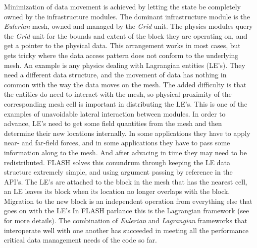 Minimization of data movement is achieved by letting the state be
completely owned by the infrastructure modules. The dominant
infrastructure module is the {\em Eulerian} mesh, owned and managed by
the {\em Grid} unit. The physics modules query the {\em Grid} unit
for the bounds and extent of the block they are operating on, and
get a pointer to the physical data. This arrangement works in most
cases, but gets tricky where  the data access pattern does not conform
to the underlying mesh. An example is any physics dealing with
Lagrangian entities (LE's). They need a different data structure, and
the movement of data has nothing in common with the way the data moves
on the mesh. The added difficulty is that the entities do need to
interact with the mesh, so physical proximity of the corresponding
mesh cell is important in distributing the LE's. This is one of the
examples of unavoidable lateral interaction between modules. In order
to advance, LE's need to get some field quantities from the mesh and
then determine their new locations internally. In some applications
they have to apply near- and far-field forces, and in some
applications they have to pass some information along to the mesh. And
after advacing in time they may need to be redistributed. FLASH solves
this conundrum through keeping the LE data structure extremely simple,
and using argument passing by reference in the API's. The LE's are
attached to the block in the mesh that has the nearest cell, an LE
leaves its block when its location no longer overlaps with the
block. Migration to the new block is an independent operation from
everything else that goes on with the LE's In FLASH parlance this is
the Lagrangian framework (see \cite{Dubey2012} for more details). The
combination of {\em Eulerian} and {\em Lagrangian} frameworks that
interoperate well with one another has succeeded in meeting all the
performance critical data management needs of the code so far. 

